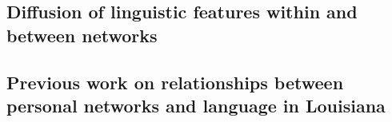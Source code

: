     \subsection{Diffusion of linguistic features within and between networks}
    \subsection{Previous work on relationships between personal networks and language in Louisiana}
